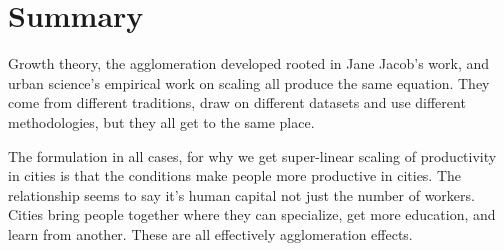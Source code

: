 {%



\section{Summary}
{\color{red}
Growth theory, the agglomeration developed rooted in Jane Jacob's work, and urban science's empirical work on scaling all produce the same equation. They come from different %
traditions, draw on different datasets and use different methodologies, but they all get to the same place. 

The formulation in all cases, for why we get super-linear scaling of productivity in cities is %
that the conditions make people more productive in cities. The relationship seems to say it's human capital not just the number of workers. %
Cities bring people together where they can specialize, get more education, and learn from another. These are all effectively agglomeration effects. 

}}
